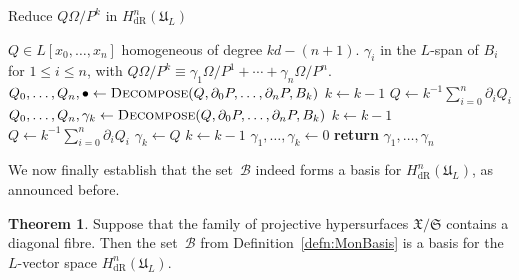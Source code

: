 \documentclass[a4paper,11pt]{article}
\numberwithin{equation}{section}
\providecommand{\HdR}{H_{\text{dR}}}    %
\providecommand{\cB}{\mathcal{B}} %
\theoremstyle{definition}
\newtheorem{thm}{Theorem}[section]
\begin{document}
\begin{algorithm}
\caption{Reduce $Q \Omega / P^k$ in $\HdR^n(\mathfrak{U}_L)$}
\label{alg:PoleRed}
\begin{algorithmic}
\vspace{1mm}
\Require $Q \in L[x_0, \dotsc, x_n]$ homogeneous of degree $kd - (n+1)$.
\Ensure  $\gamma_i$ in the $L$-span of $B_i$ for $1 \leq i \leq n$, with  
         $Q \Omega / P^k \equiv \gamma_{1} \Omega / P^{1} + \dotsb + \gamma_n \Omega / P^n$.
\State $Q_0, \dotsc, Q_n, \bullet \gets \Call{Decompose}{Q, \partial_0 P, \dotsc, \partial_n P, B_k}$
\State $k \gets k-1$
\State $Q \gets k^{-1} \sum_{i=0}^n \partial_i Q_i$
\EndWhile
{}
\State $Q_0, \dotsc, Q_n, \gamma_k \gets \Call{Decompose}{Q, \partial_0 P, \dotsc, \partial_n P, B_k}$
\State $k \gets k-1$
\State $Q \gets k^{-1} \sum_{i=0}^n \partial_i Q_i$
\EndWhile
{}
\State $\gamma_{k} \gets Q$
\State $k \gets k-1$
\EndIf
\State $\gamma_{1}, \dotsc, \gamma_{k} \gets 0$
\State \textbf{return} $\gamma_{1}, \dotsc, \gamma_n$
\EndProcedure
\end{algorithmic}
\end{algorithm}

We now finally establish that the set~$\cB$ indeed forms a basis for 
$\HdR^n(\mathfrak{U}_L)$, as announced before.

\begin{thm} \label{thm:Basis}
Suppose that the family of projective hypersurfaces $\mathfrak{X}/\mathfrak{S}$ 
contains a diagonal fibre.  Then the set~$\cB$ from Definition~\ref{defn:MonBasis} 
is a basis for the $L$-vector space $\HdR^n(\mathfrak{U}_L)$.
\end{thm}
\end{document}
